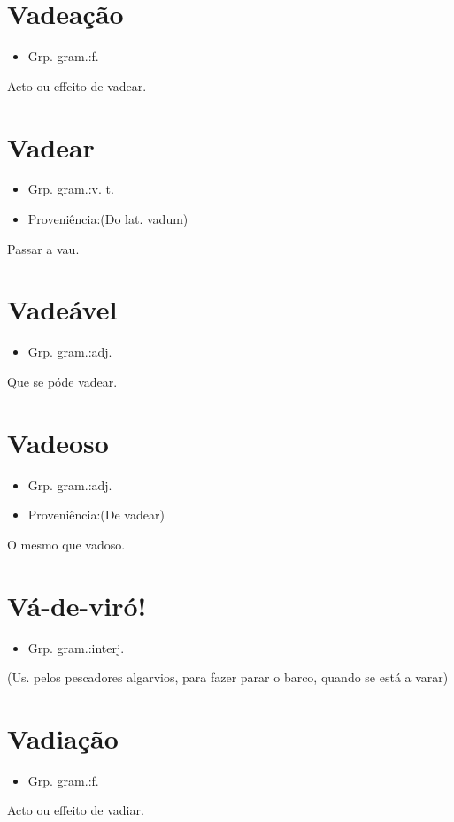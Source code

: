\documentclass{article}
\begin{document}
\section{Vadeação}
\begin{itemize}
\item {Grp. gram.:f.}
\end{itemize}
Acto ou effeito de vadear.
\section{Vadear}
\begin{itemize}
\item {Grp. gram.:v. t.}
\end{itemize}
\begin{itemize}
\item {Proveniência:(Do lat. \textunderscore vadum\textunderscore )}
\end{itemize}
Passar a vau.
\section{Vadeável}
\begin{itemize}
\item {Grp. gram.:adj.}
\end{itemize}
Que se póde vadear.
\section{Vadeoso}
\begin{itemize}
\item {Grp. gram.:adj.}
\end{itemize}
\begin{itemize}
\item {Proveniência:(De \textunderscore vadear\textunderscore )}
\end{itemize}
O mesmo que \textunderscore vadoso\textunderscore .
\section{Vá-de-viró!}
\begin{itemize}
\item {Grp. gram.:interj.}
\end{itemize}
(Us. pelos pescadores algarvios, para fazer parar o barco, quando se está a varar)
\section{Vadiação}
\begin{itemize}
\item {Grp. gram.:f.}
\end{itemize}
Acto ou effeito de vadiar.
\end{document}
